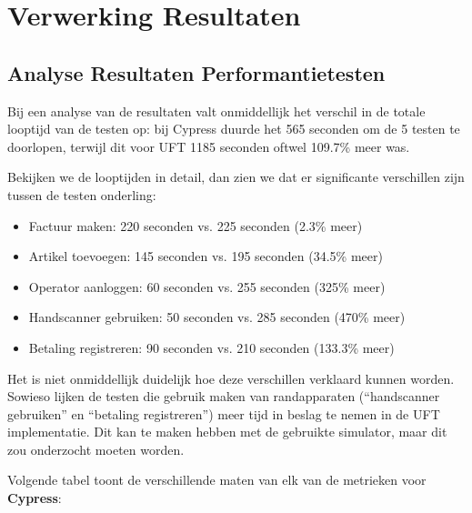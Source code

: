 
\chapter{Verwerking Resultaten}
\label{ch:verwerking-resultaten}

\section{Analyse Resultaten Performantietesten}
\label{sec:analyse-performantietesten}

Bij een analyse van de resultaten valt onmiddellijk het verschil in de totale looptijd van de testen op: bij Cypress duurde het 565 seconden om de 5 testen te doorlopen, terwijl dit voor UFT 1185 seconden oftwel 109.7\% meer was.

Bekijken we de looptijden in detail, dan zien we dat er significante verschillen zijn tussen de testen onderling:

\begin{itemize}
    \item Factuur maken: 220 seconden vs. 225 seconden (2.3\% meer)
    \item Artikel toevoegen: 145 seconden vs. 195 seconden (34.5\% meer)
    \item Operator aanloggen: 60 seconden vs. 255 seconden (325\% meer)
    \item Handscanner gebruiken: 50 seconden vs. 285 seconden (470\% meer)
    \item Betaling registreren: 90 seconden vs. 210 seconden (133.3\% meer)
\end{itemize}

Het is niet onmiddellijk duidelijk hoe deze verschillen verklaard kunnen worden. Sowieso lijken de testen die gebruik maken van randapparaten (``handscanner gebruiken'' en ``betaling registreren'') meer tijd in beslag te nemen in de UFT implementatie. Dit kan te maken hebben met de gebruikte simulator, maar dit zou onderzocht moeten worden.

Volgende tabel toont de verschillende maten van elk van de metrieken voor \textbf{Cypress}:


